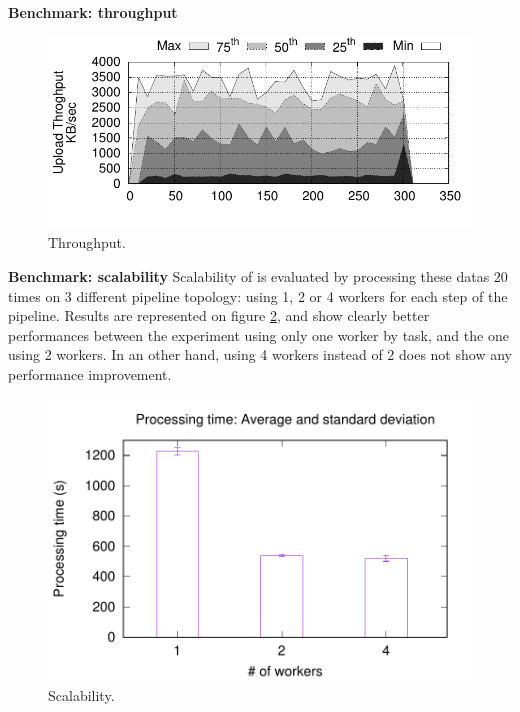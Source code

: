 \textbf{Benchmark: throughput}

\begin{figure}[t!]
  \centering
  \includegraphics[width=.99\linewidth]{images/tput_upload}
  \caption{Throughput.}
  \label{fig:throughput}
\end{figure}

\textbf{Benchmark: scalability}
Scalability of \SYS is evaluated by processing these datas 20 times on 3 different pipeline topology: using 1, 2 or 4 workers for each step of the pipeline.
Results are represented on figure \ref{fig:scalability}, and show clearly better performances between the experiment using only one worker by task, and the one using 2 workers.
In an other hand, using 4 workers instead of 2 does not show any performance improvement.

\begin{figure}[t!]
  \centering
  \includegraphics[width=.99\linewidth]{images/avg_stdev_4_streams}
  \caption{Scalability.}
  \label{fig:scalability}
\end{figure}

